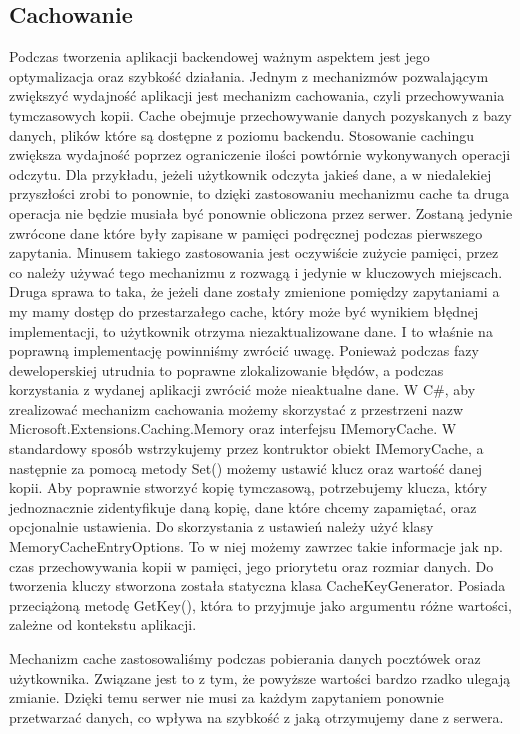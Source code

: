 \documentclass[a4paper,twoside,12pt]{book}
\begin{document}
\subsection{Cachowanie} 
Podczas tworzenia aplikacji backendowej ważnym aspektem jest jego optymalizacja oraz szybkość działania. Jednym z mechanizmów pozwalającym zwiększyć wydajność aplikacji jest mechanizm cachowania, czyli przechowywania tymczasowych kopii. Cache obejmuje przechowywanie danych pozyskanych z bazy danych, plików które są dostępne z poziomu backendu. Stosowanie cachingu zwiększa wydajność poprzez ograniczenie ilości powtórnie wykonywanych operacji odczytu. Dla przykładu, jeżeli użytkownik odczyta jakieś dane, a w niedalekiej przyszłości zrobi to ponownie, to dzięki zastosowaniu mechanizmu cache ta druga operacja nie będzie musiała być ponownie obliczona przez serwer. Zostaną jedynie zwrócone dane które były zapisane w pamięci podręcznej podczas pierwszego zapytania. Minusem takiego zastosowania jest oczywiście zużycie pamięci, przez co należy używać tego mechanizmu z rozwagą i jedynie w kluczowych miejscach. Druga sprawa to taka, że jeżeli dane zostały zmienione pomiędzy zapytaniami a my mamy dostęp do przestarzałego cache, który może być wynikiem błędnej implementacji, to użytkownik otrzyma niezaktualizowane dane. I to właśnie na poprawną implementację powinniśmy zwrócić uwagę. Ponieważ podczas fazy deweloperskiej utrudnia to poprawne zlokalizowanie błędów, a podczas korzystania z wydanej aplikacji zwrócić może nieaktualne dane. 
W C\#, aby zrealizować mechanizm cachowania możemy skorzystać z przestrzeni nazw Microsoft.Extensions.Caching.Memory oraz interfejsu IMemoryCache. W standardowy sposób wstrzykujemy przez kontruktor obiekt IMemoryCache, a następnie za pomocą metody Set() możemy ustawić klucz oraz wartość danej kopii. Aby poprawnie stworzyć kopię tymczasową, potrzebujemy klucza, który jednoznacznie zidentyfikuje daną kopię, dane które chcemy zapamiętać, oraz opcjonalnie ustawienia. Do skorzystania z ustawień należy użyć klasy MemoryCacheEntryOptions. To w niej możemy zawrzec takie informacje jak np. czas przechowywania kopii w pamięci, jego priorytetu oraz rozmiar danych. Do tworzenia kluczy stworzona została statyczna klasa CacheKeyGenerator. Posiada przeciążoną metodę GetKey(), która to przyjmuje jako argumentu różne wartości, zależne od kontekstu aplikacji. 

Mechanizm cache zastosowaliśmy podczas pobierania danych pocztówek oraz użytkownika. Związane jest to z tym, że powyższe wartości bardzo rzadko ulegają zmianie. Dzięki temu serwer nie musi za każdym zapytaniem ponownie przetwarzać danych, co wpływa na szybkość z jaką otrzymujemy dane z serwera.
\end{document}
